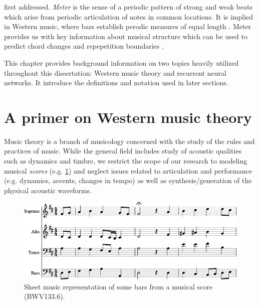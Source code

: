 

\citet{eck2008learning} first addressed. \emph{Meter} is the sense of a periodic
pattern of strong and weak beats which arise from periodic articulation of
notes in common locations. It is implied in Western music, where bars establish
perodic measures of equal length \citep{handel1993listening}. Meter provides us
with key information about musical structure which can be used to predict chord
changes and repepetition boundaries \citep{cooper1963rhythmic}.



This chapter provides background information on two topics heavily utilized
throughout this dissertation: Western music theory and recurrent neural
networks. It introduce the definitions and notation used in later sections.

\section{A primer on Western music theory}

Music theory is a branch of musicology concerned with the study of the rules
and practices of music. While the general field includes study of acoustic
qualities such as dynamics and timbre, we restrict the scope of our research to
modeling musical \emph{scores} (e.g. \cref{fig:eg-score}) and neglect issues
related to articulation and performance (e.g. dynamics, accents, changes in
tempo) as well as synthesis/generation of the physical acoustic waveforms.

\begin{figure}[htbp]
    \centering
    \includegraphics[width=0.8\linewidth]{bwv133-6-original-score-1.png}
    \caption{Sheet music representation of some bars from a musical score (BWV133.6).}
    \label{fig:eg-score}
\end{figure}

